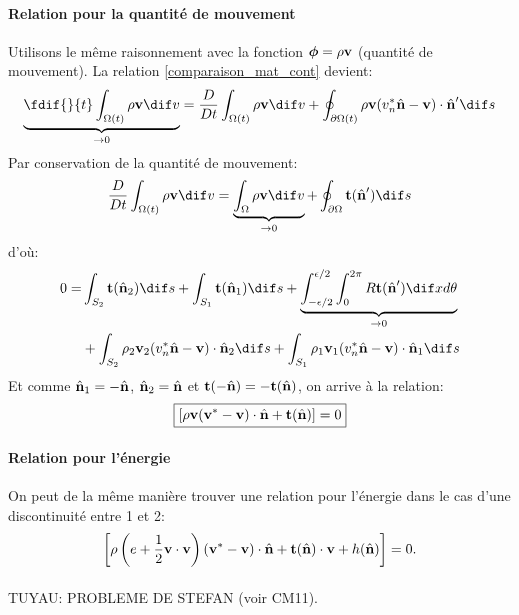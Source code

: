 \paragraph{Relation pour la quantité de mouvement}
Utilisons le même raisonnement avec la fonction $\boldsymbol{\phi}=\rho\textbf{v}$ (quantité de mouvement). La relation \ref{comparaison_mat_cont} devient:
$$\underbrace{\fdif{}{t}\int_{\Omega (t)}\rho\fv{v}  \dif v}_{\rightarrow 0}=\frac{D}{Dt}\int_{\Omega (t)}\rho\fv{v}  \dif v+\oint_{\partial \Omega (t)}\rho\fv{v}(v_n^*\hat{\fv{n}}-\fv{v})\cdot \hat{\fv{n}}' \dif s$$
Par conservation de la quantité de mouvement:
$$\frac{D}{Dt}\int_{\Omega (t)}\rho\fv{v}  \dif v = \underbrace{\int_{\Omega}\rho\fv{v} \dif v}_{\rightarrow 0}+\oint_{\partial\Omega}\fv{t}(\hat{\fv{n}}') \dif s$$
d'où:
\begin{align*}
0=&\int_{S_2}\fv{t}(\hat{\fv{n}}_2) \dif s + \int_{S_1}\fv{t}(\hat{\fv{n}}_1) \dif s + \underbrace{\int_{-\epsilon/2}^{\epsilon/2}\int_0^{2\pi}R\fv{t} (\hat{\fv{n}}') \dif xd\theta}_{\rightarrow 0}\\
 &+\int_{S_2}\rho_2\fv{v}_2(v_n^*\hat{\fv{n}}-\fv{v})\cdot\hat{\fv{n}}_2 \dif s + \int_{S_1}\rho_1\fv{v}_1(v_n^*\hat{\fv{n}}-\fv{v})\cdot\hat{\fv{n}}_1 \dif s
\end{align*}
Et comme $\hat{\textbf{n}}_1=-\hat{\textbf{n}}$, $\hat{\textbf{n}}_2=\hat{\textbf{n}}$ et $\textbf{t}(-\hat{\textbf{n}})=-\textbf{t}(\hat{\textbf{n}})$, on arrive à la relation:
$$\boxed{[\rho\textbf{v}(\textbf{v}^*-\textbf{v})\cdot\hat{\textbf{n}}+\textbf{t}(\hat{\textbf{n}})]=0}$$

\paragraph{Relation pour l'énergie}
On peut de la même manière trouver une relation pour l'énergie dans le cas d'une discontinuité entre 1 et 2:
$$\left[\rho\left(e+\frac{1}{2}\textbf{v}\cdot\textbf{v}\right)(\textbf{v}^*-\textbf{v})\cdot\hat{\textbf{n}}+\textbf{t}(\hat{\textbf{n}})\cdot\textbf{v}+h(\hat{\textbf{n}})\right]=0.$$
\paragraph{}
\vspace{3cm}
TUYAU: PROBLEME DE STEFAN (voir CM11).



